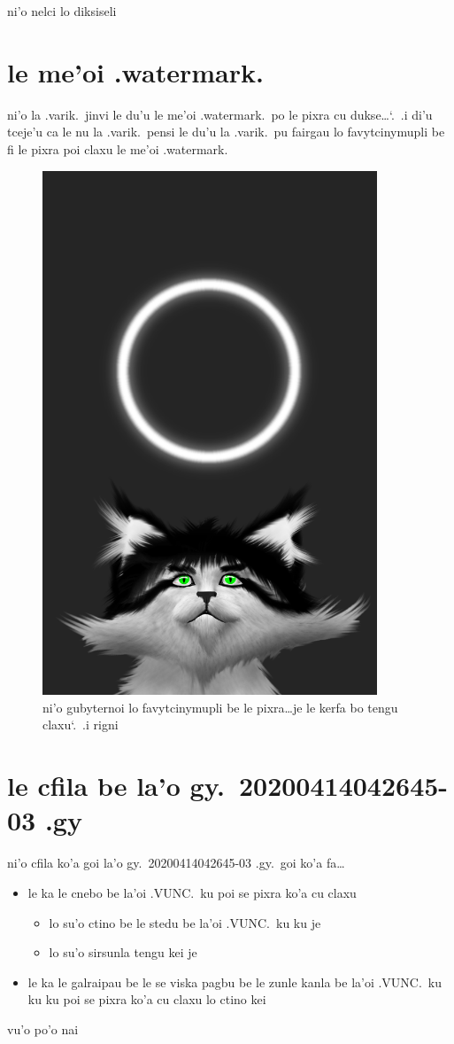 \documentclass{report}
\newcommand\sds{\spacefactor\sfcode`.\ \space}
\begin{document}
ni'o nelci lo diksiseli

\section{le me'oi .watermark.}
ni'o la .varik.\ jinvi le du'u le me'oi .watermark.\ po le pixra cu dukse\ldots\sds .i di'u tceje'u ca le nu la .varik.\ pensi le du'u la .varik.\ pu fairgau lo favytcinymupli be fi le pixra poi claxu le me'oi .watermark.

\begin{figure}[ht]
	\centering
	\includegraphics[width=10cm]{20200414042645-03/20200414042645-03-uw.png}
	\caption[center]{ni'o gubyternoi lo favytcinymupli be le pixra\ldots je le kerfa bo tengu claxu\sds  .i rigni}
\end{figure}

\section{le cfila be la'o gy.\ 20200414042645-03 .gy}
ni'o cfila ko'a goi la'o gy.\ 20200414042645-03 .gy.\ goi ko'a fa\ldots
\begin{itemize}
	\item le ka le cnebo be la'oi .VUNC.\ ku poi se pixra ko'a cu claxu
	\begin{itemize}
		\item lo su'o ctino be le stedu be la'oi .VUNC.\ ku ku je
		\item lo su'o sirsunla tengu kei je
	\end{itemize}
	\item le ka le galraipau be le se viska pagbu be le zunle kanla be la'oi .VUNC.\ ku ku ku poi se pixra ko'a cu claxu lo ctino kei
\end{itemize}
vu'o po'o nai
\end{document}
